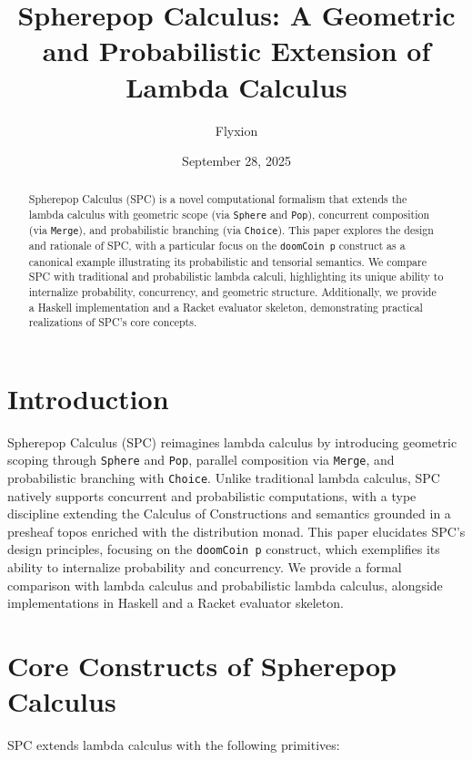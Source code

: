 \documentclass{article}
\begin{document}
\title{Spherepop Calculus: A Geometric and Probabilistic Extension of Lambda Calculus}
\author{Flyxion}
\date{September 28, 2025}
\maketitle

\begin{abstract}
Spherepop Calculus (SPC) is a novel computational formalism that extends the lambda calculus with geometric scope (via \texttt{Sphere} and \texttt{Pop}), concurrent composition (via \texttt{Merge}), and probabilistic branching (via \texttt{Choice}). This paper explores the design and rationale of SPC, with a particular focus on the \texttt{doomCoin p} construct as a canonical example illustrating its probabilistic and tensorial semantics. We compare SPC with traditional and probabilistic lambda calculi, highlighting its unique ability to internalize probability, concurrency, and geometric structure. Additionally, we provide a Haskell implementation and a Racket evaluator skeleton, demonstrating practical realizations of SPC’s core concepts.
\end{abstract}

\section{Introduction}
Spherepop Calculus (SPC) reimagines lambda calculus by introducing geometric scoping through \texttt{Sphere} and \texttt{Pop}, parallel composition via \texttt{Merge}, and probabilistic branching with \texttt{Choice}. Unlike traditional lambda calculus, SPC natively supports concurrent and probabilistic computations, with a type discipline extending the Calculus of Constructions and semantics grounded in a presheaf topos enriched with the distribution monad. This paper elucidates SPC’s design principles, focusing on the \texttt{doomCoin p} construct, which exemplifies its ability to internalize probability and concurrency. We provide a formal comparison with lambda calculus and probabilistic lambda calculus, alongside implementations in Haskell and a Racket evaluator skeleton.

\section{Core Constructs of Spherepop Calculus}
SPC extends lambda calculus with the following primitives:
\end{document}
